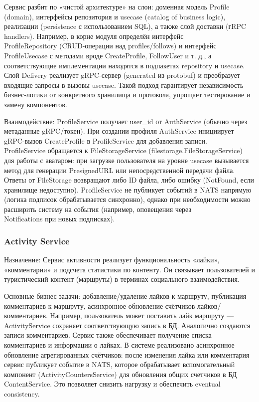 \noindent Сервис разбит по «чистой архитектуре» на слои: доменная модель Profile (domain), интерфейсы репозитория и usecase (catalog of business logic), реализации (persistence с использованием SQL), а также слой доставки (гRPC handlers). Например, в корне модуля определён интерфейс \\ ProfileRepository (CRUD-операции над profiles/follows) и интерфейс ProfileUsecase с методами вроде CreateProfile, FollowUser и т. д., а соответствующие имплементации находятся в подпакетах repository и usecase. Слой Delivery реализует gRPC-сервер (generated из protobuf) и преобразует входящие запросы в вызовы usecase. Такой подход гарантирует независимость бизнес-логики от конкретного хранилища и протокола, упрощает тестирование и замену компонентов.

Взаимодействие: ProfileService получает user\_id от AuthService (обычно через метаданные gRPC/токен). При создании профиля AuthService инициирует gRPC-вызов CreateProfile в ProfileService для добавления записи. \\ ProfileService обращается к FileStorageService (filestorage.FileStorageService) для работы с аватаром: при загрузке пользователя на уровне usecase вызывается метод для генерации PresignedURL или непосредственной передачи файла. Ответы от FileStorage возвращают либо ID файла, либо ошибку (NotFound, если хранилище недоступно). ProfileService не публикует событий в NATS напрямую (логика подписок обрабатывается синхронно), однако при необходимости можно расширить систему на события (например, оповещения через \\ Notifications при новых подписках).

\subsubsection*{Activity Service}
Назначение: Сервис активности реализует функциональность «лайки», «комментарии» и подсчета статистики по контенту. Он связывает пользователей и туристический контент (маршруты) в терминах социального взаимодействия.

Основные бизнес-задачи: добавление/удаление лайков к маршруту, публикация комментариев к маршруту, асинхронное обновление счётчиков лайков/комментариев. Например, пользователь может поставить лайк маршруту — ActivityService сохраняет соответствующую запись в БД. Аналогично создаются записи комментариев. Сервис также обеспечивает получение списка комментариев и информации о лайках. В системе реализовано асинхронное обновление агрегированных счётчиков: после изменения лайка или комментария сервис публикует событие в NATS, которое обрабатывает вспомогательный компонент (ActivityCountersService) для обновления общих счетчиков в БД ContentService. Это позволяет снизить нагрузку и обеспечить eventual consistency.

